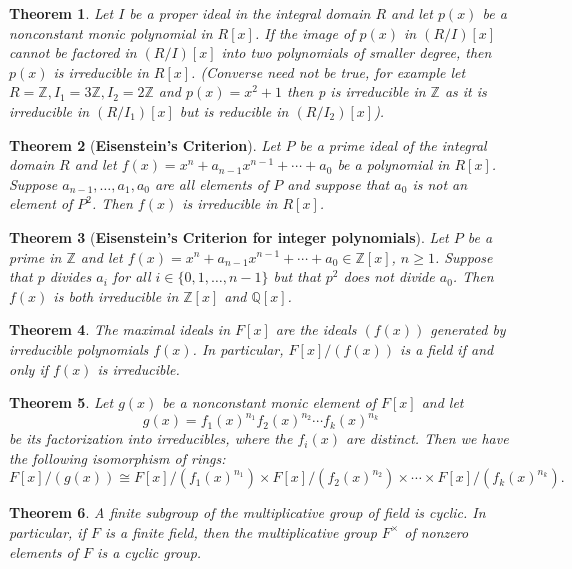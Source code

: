 \documentclass[answers, a4paper, 12pt]{exam}
\newtheorem{theorem}{Theorem}[section]
\newcommand{\Q}{\mathbb{Q}}
\newcommand{\Z}{\mathbb{Z}}
\begin{document}
\begin{theorem}
    Let $I$ be a proper ideal in the integral domain $R$ and let $p(x)$ be a nonconstant monic polynomial in $R[x]$. If the image of $p(x)$ in $(R/I)[x]$ cannot be factored in $(R/I)[x]$ into two polynomials of smaller degree, then $p(x)$ is irreducible in $R[x]$. (Converse need not be true, for example let $R=\Z, I_1=3\Z, I_2=2\Z$ and $p(x)=x^2+1$ then p is irreducible in $\Z$ as it is irreducible in $(R/I_1)[x]$ but is reducible in $(R/I_2)[x]$).
\end{theorem}

\begin{theorem}[\textbf{Eisenstein's Criterion}]
    Let $P$ be a prime ideal of the integral domain $R$ and let $f(x)=x^n+a_{n-1}x^{n-1}+\cdots+a_0$ be a polynomial in $R[x]$. Suppose $a_{n-1},\ldots, a_1, a_0$ are all elements of $P$ and suppose that $a_0$ is not an element of $P^2$. Then $f(x)$ is irreducible in $R[x]$.
\end{theorem}

\begin{theorem}[\textbf{Eisenstein's Criterion for integer polynomials}]
    Let $P$ be a prime in $\Z$ and let $f(x)=x^n+a_{n-1}x^{n-1}+\cdots+a_0\in\Z[x]$, $n\geq 1$. Suppose that $p$ divides $a_i$ for all $i\in\{0,1,\ldots,n-1\}$ but that $p^2$ does not divide $a_0$. Then $f(x)$ is both irreducible in $\Z[x]$ and $\Q[x]$.
\end{theorem}

\begin{theorem}
    The maximal ideals in $F[x]$ are the ideals $(f(x))$ generated by irreducible polynomials $f(x)$. In particular, $F[x]/(f(x))$ is a field if and only if $f(x)$ is irreducible.
\end{theorem}

\begin{theorem}
    Let $g(x)$ be a nonconstant monic element of $F[x]$ and let
    $$g(x)=f_1(x)^{n_1}f_2(x)^{n_2}\cdots f_k(x)^{n_k}$$
    be its factorization into irreducibles, where the $f_i(x)$ are distinct. Then we have the following isomorphism of rings:
    $$F[x]/(g(x))\cong F[x]/(f_1(x)^{n_1})\times F[x]/(f_2(x)^{n_2})\times\cdots\times F[x]/(f_k(x)^{n_k}).$$
\end{theorem}

\begin{theorem}
    A finite subgroup of the multiplicative group of field is cyclic. In particular, if $F$ is a finite field, then the multiplicative group $F^{\times}$ of nonzero elements of $F$ is a cyclic group.
\end{theorem}
\end{document}

